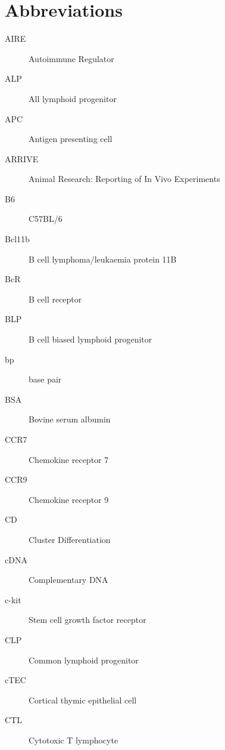 
\chapter*{Abbreviations}

\begin{description}



\item[AIRE]		
Autoimmune Regulator

\item[ALP]
All lymphoid progenitor

\item[APC]
Antigen presenting cell

\item[ARRIVE] 
Animal Research: Reporting of In Vivo Experiments

\item[B6]
C57BL/6

\item[Bcl11b]
B cell lymphoma/leukaemia protein 11B

\item[BcR]
B cell receptor

\item[BLP]
B cell biased lymphoid progenitor

\item[bp]
base pair

\item[BSA]
Bovine serum albumin

\item[CCR7]
Chemokine receptor 7

\item[CCR9]
Chemokine receptor 9

\item[CD]
Cluster Differentiation

\item[cDNA]
Complementary DNA

\item[c-kit]
Stem cell growth factor receptor

\item[CLP]
Common lymphoid progenitor

\item[cTEC]
Cortical thymic epithelial cell

\item[CTL]
Cytotoxic T lymphocyte


\end{description}
